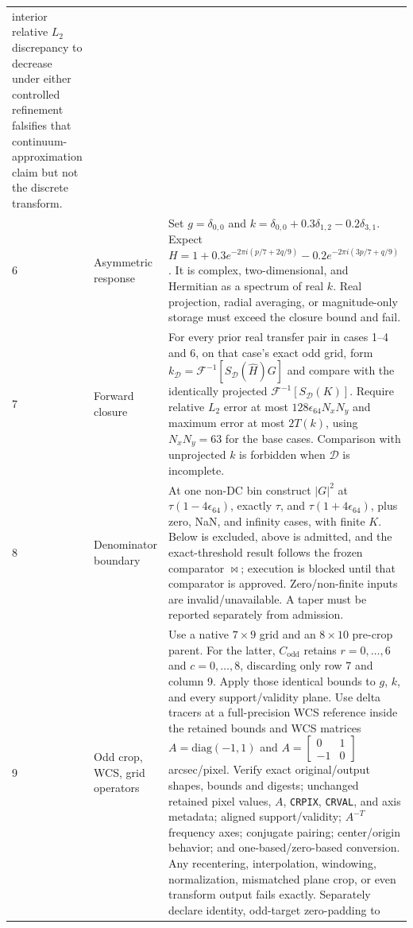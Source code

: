 \documentclass[11pt]{article}
\newcommand{\IFFT}{\mathcal{F}^{-1}}
\begin{document}
\begin{longtable}{@{}L{0.05\textwidth}L{0.24\textwidth}L{0.62\textwidth}@{}}
interior relative $L_2$ discrepancy to decrease under either controlled
refinement falsifies that continuum-approximation claim but not the discrete
transform. \\
6 & Asymmetric response & Set $g=\delta_{0,0}$ and
$k=\delta_{0,0}+0.3\delta_{1,2}-0.2\delta_{3,1}$.  Expect
$H=1+0.3e^{-2\pi i(p/7+2q/9)}-0.2e^{-2\pi i(3p/7+q/9)}$.
It is complex, two-dimensional, and Hermitian as a spectrum of real $k$.
Real projection, radial averaging, or magnitude-only storage must exceed the
closure bound and fail. \\
7 & Forward closure & For every prior real transfer pair in cases 1--4 and 6,
on that case's exact odd grid, form
$k_{\mathcal D}=\IFFT[S_{\mathcal D}(\widehat H)G]$ and compare with
the identically projected $\IFFT[S_{\mathcal D}(K)]$.  Require relative $L_2$
error at most $128\epsilon_{64}N_xN_y$ and maximum error at most $2T(k)$,
using $N_xN_y=63$ for the base cases.  Comparison with unprojected $k$ is
forbidden when $\mathcal D$ is incomplete. \\
8 & Denominator boundary & At one non-DC bin construct $|G|^2$ at
$\tau(1-4\epsilon_{64})$, exactly $\tau$, and
$\tau(1+4\epsilon_{64})$, plus zero, NaN, and infinity cases, with finite $K$.
Below is excluded, above is admitted, and the exact-threshold result follows
the frozen comparator $\bowtie$; execution is blocked until that comparator is
approved.  Zero/non-finite inputs are invalid/unavailable.  A taper must be
reported separately from admission. \\
9 & Odd crop, WCS, grid operators & Use a native $7\times9$ grid and an
$8\times10$ pre-crop parent.  For the latter, $C_{\mathrm{odd}}$ retains
$r=0,\ldots,6$ and $c=0,\ldots,8$, discarding only row 7 and column 9.  Apply
those identical bounds to $g$, $k$, and every support/validity plane.  Use delta
tracers at a full-precision WCS reference inside the retained bounds and WCS
matrices
$A=\mathrm{diag}(-1,1)$ and
$A=\begin{bmatrix}0&1\\-1&0\end{bmatrix}$ arcsec/pixel.  Verify exact
original/output shapes, bounds and digests; unchanged retained pixel values,
$A$, \texttt{CRPIX}, \texttt{CRVAL}, and axis metadata; aligned
support/validity; $A^{-T}$ frequency axes; conjugate pairing; center/origin
behavior; and one-based/zero-based conversion.  Any recentering, interpolation,
windowing, normalization, mismatched plane crop, or even transform output
fails exactly.  Separately declare identity, odd-target zero-padding to

\end{longtable}
\end{document}
